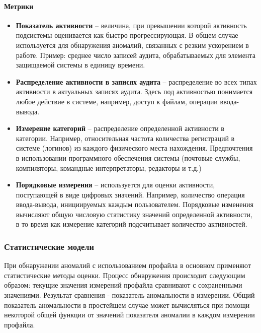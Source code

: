 \paragraph{Метрики}

\begin{itemize}
	\item \textbf{Показатель активности} -- величина, при превышении которой активность подсистемы оценивается как быстро прогрессирующая. В общем случае используется для обнаружения аномалий, связанных с резким ускорением в работе. Пример: среднее число записей аудита, обрабатываемых для элемента защищаемой системы в единицу времени.
	\item \textbf{Распределение активности в записях аудита} -- распределение во всех типах активности в актуальных записях аудита. Здесь под активностью понимается любое действие в системе, например, доступ к файлам, операции ввода-вывода.
	\item \textbf{Измерение категорий} -- распределение определенной активности в категории\footnotemark. Например, относительная частота количества регистраций в системе (логинов) из каждого физического места нахождения. Предпочтения в использовании программного обеспечения системы (почтовые службы, компиляторы, командные интерпретаторы, редакторы и т.д.)
	\item \textbf{Порядковые измерения} -- используется для оценки активности, поступающей в виде цифровых значений. Например, количество операция ввода-вывода, инициируемых каждым пользователем. Порядковые изменения вычисляют общую числовую статистику значений определенной активности, в то время как измерение категорий подсчитывает количество активностей.
\end{itemize}


\subsubsection*{Статистические модели}

При обнаружении аномалий с использованием профайла в основном применяют статистические методы оценки. Процесс обнаружения происходит следующим образом: текущие значения измерений профайла сравнивают с сохраненными значениями. Результат сравнения - показатель аномальности в измерении. Общий показатель аномальности в простейшем случае может вычисляться при помощи некоторой общей функции от значений показателя аномалии в каждом измерении профайла.

